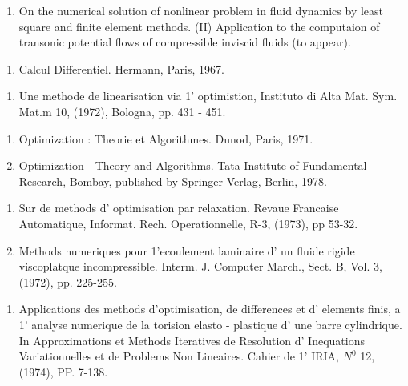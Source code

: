 \begin{thebibliography}{99}
\begin{enumerate}
  \item On the numerical solution of nonlinear problem in fluid
 dynamics by least square and finite element methods. (II)
 Application to the computaion of transonic potential flows of
 compressible inviscid fluids (to appear).\label{k24:e2} 
  \end{enumerate}


  \begin{enumerate}
  \item  Calcul Differentiel. Hermann, Paris, 1967.\label{k25:e1}
  \end{enumerate}


  \begin{enumerate}
  \item Une methode de linearisation via 1' optimistion, Instituto di
 Alta Mat. Sym. Mat.m 10, (1972), Bologna, pp. 431 - 451.\label{k26:e1} 
  \end{enumerate}


  \begin{enumerate}
  \item Optimization : Theorie et Algorithmes. Dunod, Paris,
    1971.\label{k27:e1} 

  \item  Optimization - Theory and Algorithms. Tata Institute of
 Fundamental Research, Bombay, published by Springer-Verlag,
 Berlin, 1978.\label{k27:e2}
  \end{enumerate}


  \begin{enumerate}
  \item  Sur de methods d' optimisation par relaxation. Revaue
 Francaise Automatique, Informat. Rech. Operationnelle, R-3,
 (1973), pp 53-32.\label{k28:e1} 

  \item Methods numeriques pour 1'ecoulement laminaire d' un fluide
 rigide viscoplatque incompressible. Interm. J. Computer March.,
 Sect. B, Vol. 3, (1972), pp. 225-255.\label{k28:e2}
  \end{enumerate}

\pageoriginale

  \begin{enumerate}
  \item Applications des methods d'optimisation, de differences et d'
 elements finis, a 1' analyse numerique de la torision elasto -
 plastique d' une barre cylindrique. In Approximations et Methods
 Iteratives de Resolution d' Inequations Variationnelles et de
 Problems Non Lineaires. Cahier de 1' IRIA, $N^0$ 12, (1974),
 PP. 7-138.\label{k29:e1} 
  \end{enumerate}


\end{thebibliography}
